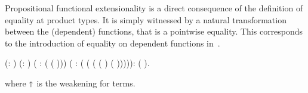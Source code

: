 
\begin{coqdoccode}
\coqdocemptyline
\coqdocemptyline
\end{coqdoccode}


  Propositional functional extensionality is a direct consequence of the definition
  of equality at product types. It is simply witnessed by a natural transformation
  between the (dependent) functions, that is a pointwise equality. This corresponds 
  to the introduction of equality on dependent functions in~\cite{DBLP:conf/popl/LicataH12}.
\begin{coqdoccode}
\coqdocemptyline
\coqdocemptyline
\coqdocnoindent
{}   (: ) (: ) ( : ( (\coqdocdefinition{$\Lambda$} )))\coqdoceol
\coqdocindent{1.00em}
( :  ( (\coqdocdefinition{$\Lambda$} ( (  \coqdocnotation{$\star$}  ) (  \coqdocnotation{$\star$}  ))))):  (  ).\coqdoceol
\coqdocemptyline
\end{coqdoccode}
 \noindent where $\shortuparrow$ is the weakening for terms. 
\begin{coqdoccode}
\end{coqdoccode}
